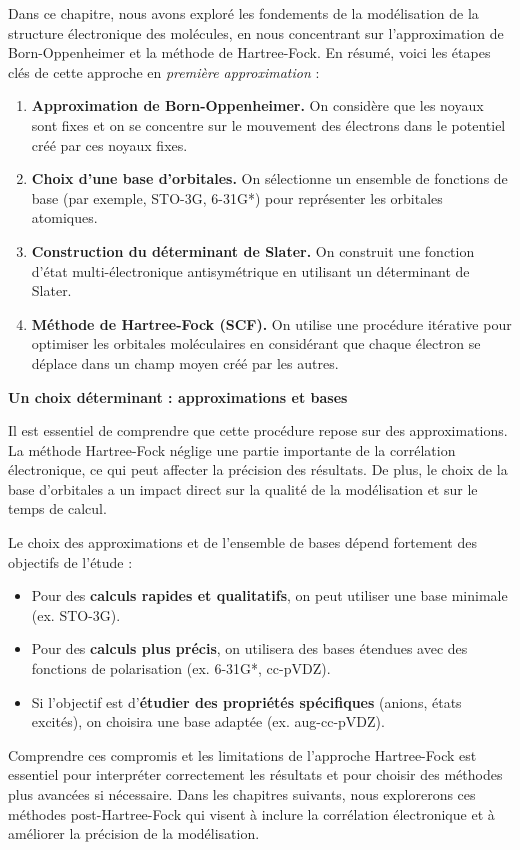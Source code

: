 \documentclass[12pt,a4paper]{article} %
\numberwithin{equation}{section} %
\numberwithin{figure}{section} %
\numberwithin{table}{section} %
\begin{document}
Dans ce chapitre, nous avons exploré les fondements de la modélisation de la structure électronique des molécules, en nous concentrant sur l'approximation de Born-Oppenheimer et la méthode de Hartree-Fock. En résumé, voici les étapes clés de cette approche en \textit{première approximation} :
\begin{enumerate}
    \item \textbf{Approximation de Born-Oppenheimer.} On considère que les noyaux sont fixes et on se concentre sur le mouvement des électrons dans le potentiel créé par ces noyaux fixes.
    \item \textbf{Choix d'une base d'orbitales.} On sélectionne un ensemble de fonctions de base (par exemple, STO-3G, 6-31G*) pour représenter les orbitales atomiques.
    \item \textbf{Construction du déterminant de Slater.} On construit une fonction d'état multi-électronique antisymétrique en utilisant un déterminant de Slater.
    \item \textbf{Méthode de Hartree-Fock (SCF).} On utilise une procédure itérative pour optimiser les orbitales moléculaires en considérant que chaque électron se déplace dans un champ moyen créé par les autres.
\end{enumerate}

\textbf{Un choix déterminant : approximations et bases}

Il est essentiel de comprendre que cette procédure repose sur des approximations. La méthode Hartree-Fock néglige une partie importante de la corrélation électronique, ce qui peut affecter la précision des résultats. De plus, le choix de la base d'orbitales a un impact direct sur la qualité de la modélisation et sur le temps de calcul.

Le choix des approximations et de l'ensemble de bases dépend fortement des objectifs de l'étude :
\begin{itemize}
    \item Pour des \textbf{calculs rapides et qualitatifs}, on peut utiliser une base minimale (ex. STO-3G).
    \item Pour des \textbf{calculs plus précis}, on utilisera des bases étendues avec des fonctions de polarisation (ex. 6-31G*, cc-pVDZ).
    \item Si l'objectif est d'\textbf{étudier des propriétés spécifiques} (anions, états excités), on choisira une base adaptée (ex. aug-cc-pVDZ).
\end{itemize}
Comprendre ces compromis et les limitations de l'approche Hartree-Fock est essentiel pour interpréter correctement les résultats et pour choisir des méthodes plus avancées si nécessaire. Dans les chapitres suivants, nous explorerons ces méthodes post-Hartree-Fock qui visent à inclure la corrélation électronique et à améliorer la précision de la modélisation.
\end{document}
